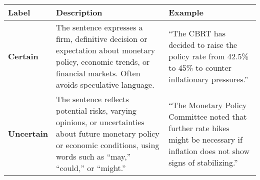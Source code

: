 \begin{table*}
    \caption{}
    \vspace{1em}
    \begin{tabular}{p{}p{}p{}}
    \toprule
    \textbf{Label} & \textbf{Description} & \textbf{Example}\\
    \midrule
    \textbf{Certain} & The sentence expresses a firm, definitive decision or expectation about monetary policy, economic trends, or financial markets. Often avoids speculative language. & “The CBRT has decided to raise the policy rate from 42.5\% to 45\% to counter inflationary pressures.” \\
    \midrule
    \textbf{Uncertain} & The sentence reflects potential risks, varying opinions, or uncertainties about future monetary policy or economic conditions, using words such as “may,” “could,” or “might.” & “The Monetary Policy Committee noted that further rate hikes might be necessary if inflation does not show signs of stabilizing.” \\
    \bottomrule
    \end{tabular}
    \label{tb:cbrt_certainty_guide}
    \end{table*}
